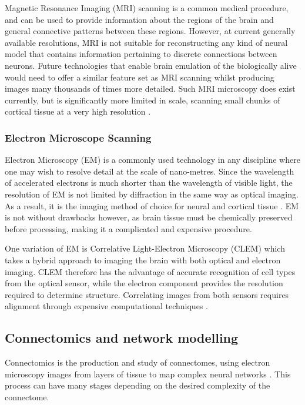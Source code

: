 Magnetic Resonance Imaging (MRI) scanning is a common medical procedure, and can
be used to provide information about the regions of the brain and general
connective patterns between these regions. However, at current generally
available resolutions, MRI is not suitable for reconstructing any kind of neural
model that contains information pertaining to discrete connections between
neurons. Future technologies that enable brain emulation of the
biologically alive would need to offer a similar feature set as MRI scanning
whilst producing images many thousands of times more detailed. Such MRI
microscopy does exist currently, but is significantly more limited in scale,
scanning small chunks of cortical tissue at a very high resolution
\autocite{johnson_three-dimensional_1987,bostrom_whole_2008}.

\subsubsection*{Electron Microscope Scanning}

Electron Microscopy (EM) is a commonly used technology in any discipline where
one may wish to resolve detail at the scale of nano-metres. Since the wavelength
of accelerated electrons is much shorter than the wavelength of visible light,
the resolution of EM is not limited by diffraction in the same way as optical
imaging. As a result, it is the imaging method of choice for neural and cortical
tissue \autocite{marc_retinal_2013, kaynig_large-scale_2015}. EM is not without
drawbacks however, as brain tissue must be chemically preserved before
processing, making it a complicated and expensive procedure. 

One variation of EM is Correlative Light-Electron Microscopy (CLEM) which takes
a hybrid approach to imaging the brain with both optical and electron imaging.
CLEM therefore has the advantage of accurate recognition of cell types from the
optical sensor, while the electron component provides the resolution required to
determine structure. Correlating images from both sensors requires alignment
through expensive computational techniques \autocite{voortman_integration_2014}.


\subsection{Connectomics and network modelling}
Connectomics is the production and study of connectomes, using electron
microscopy images from layers of tissue to map complex neural networks
\autocite{marc_retinal_2013}. This process can have many stages depending on the
desired complexity of the connectome. 

